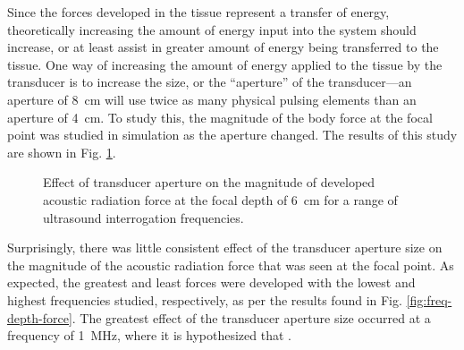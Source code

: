 			Since the forces developed in the tissue represent a transfer of energy, theoretically increasing the amount of energy input into the system should increase, or at least assist in greater amount of energy being transferred to the tissue. One way of increasing the amount of energy applied to the tissue by the transducer is to increase the size, or the ``aperture'' of the transducer---an aperture of \SI{8}{\cm} will use twice as many physical pulsing elements than an aperture of \SI{4}{\cm}. To study this, the magnitude of the body force at the focal point was studied in simulation as the aperture changed. The results of this study are shown in Fig. \ref{fig:trans-width-force}.

			\begin{figure}[!htb]
				\centering
				\caption[Effect of transducer aperture on the magnitude of acoustic radiation force]{Effect of transducer aperture on the magnitude of developed acoustic radiation force at the focal depth of \SI{6}{\cm} for a range of ultrasound interrogation frequencies.}
				\label{fig:trans-width-force}
			\end{figure}

			Surprisingly, there was little consistent effect of the transducer aperture size on the magnitude of the acoustic radiation force that was seen at the focal point. As expected, the greatest and least forces were developed with the lowest and highest frequencies studied, respectively, as per the results found in Fig. \ref{fig:freq-depth-force}. The greatest effect of the transducer aperture size occurred at a frequency of \SI{1}{\MHz}, where it is hypothesized that .

